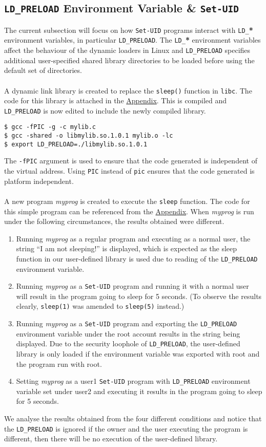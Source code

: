 \documentclass[a4paper,12pt]{article}
\begin{document}
\subsection{\texttt{LD\_PRELOAD} Environment Variable \& \texttt{Set-UID}}
The current subsection will focus on how \texttt{Set-UID} programs interact with \texttt{LD\_}\textbf{*} environment variables, in particular \texttt{LD\_PRELOAD}. The \texttt{LD\_}\textbf{*} environment variables affect the behaviour of the dynamic loaders in Linux and \texttt{LD\_PRELOAD} specifies additional user-specified shared library directories to be loaded before using the default set of directories.\\\\
A dynamic link library is created to replace the \texttt{sleep()} function in \texttt{libc}. The code for this library is attached in the \hyperref[Appsec:3.7]{Appendix}. This is compiled and \texttt{LD\_PRELOAD} is now edited to include the newly compiled library.
\begin{verbatim}
$ gcc -fPIC -g -c mylib.c
$ gcc -shared -o libmylib.so.1.0.1 mylib.o -lc
$ export LD_PRELOAD=./libmylib.so.1.0.1
\end{verbatim}
The \texttt{-fPIC} argument is used to ensure that the code generated is independent of the virtual address. Using \texttt{PIC} instead of \texttt{pic} ensures that the code generated is platform independent.\\\\A new program \textit{myprog} is created to execute the \texttt{sleep} function. The code for this simple program can be referenced from the \hyperref[Appsec:3.7.2]{Appendix}. When \textit{myprog} is run under the following circumstances, the results obtained were different.
\begin{enumerate}
	\item Running \textit{myprog} as a regular program and executing as a normal user, the string ``I am not sleeping!'' is displayed, which is expected as the sleep function in our user-defined library is used due to reading of the \texttt{LD\_PRELOAD} environment variable.
	\item Running \textit{myprog} as a \texttt{Set-UID} program and running it with a normal user will result in the program going to sleep for 5 seconds. (To observe the results clearly, \texttt{sleep(1)} was amended to \texttt{sleep(5)} instead.)
	\item Running \textit{myprog} as a \texttt{Set-UID} program and exporting the \texttt{LD\_PRELOAD} environment variable under the root account results in the string being displayed. Due to the security loophole of \texttt{LD\_PRELOAD}, the user-defined library is only loaded if the environment variable was exported with root and the program run with root.
	\item Setting \textit{myprog} as a user1 \texttt{Set-UID} program with \texttt{LD\_PRELOAD} environment variable set under user2 and executing it results in the program going to sleep for 5 seconds.
\end{enumerate}
We analyse the results obtained from the four different conditions and notice that the \texttt{LD\_PRELOAD} is ignored if the owner and the user executing the program is different, then there will be no execution of the user-defined library.
\end{document}
